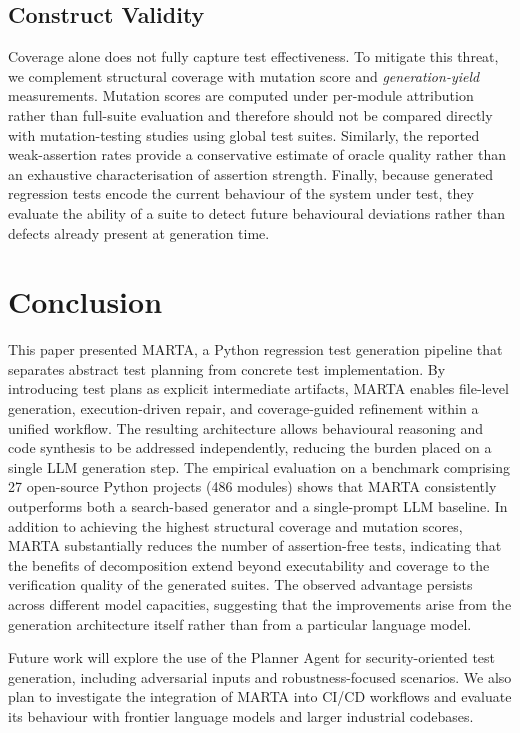 \documentclass{llncs}
\begin{document}
\subsection{Construct Validity}

Coverage alone does not fully capture test effectiveness. To mitigate this threat, we complement structural coverage with mutation score and \emph{generation-yield} measurements. Mutation scores are computed under per-module attribution rather than full-suite evaluation and therefore should not be compared directly with mutation-testing studies using global test suites. Similarly, the reported weak-assertion rates provide a conservative estimate of oracle quality rather than an exhaustive characterisation of assertion strength. Finally, because generated regression tests encode the current behaviour of the system under test, they evaluate the ability of a suite to detect future behavioural deviations rather than defects already present at generation time.



\section{Conclusion}
\label{sec:conc}

This paper presented MARTA, a Python regression test generation pipeline that separates abstract test planning from concrete test implementation. By introducing test plans as explicit intermediate artifacts, MARTA enables file-level generation, execution-driven repair, and coverage-guided refinement within a unified workflow. The resulting architecture allows behavioural reasoning and code synthesis to be addressed independently, reducing the burden placed on a single LLM generation step.
%
The empirical evaluation on a benchmark comprising 27 open-source Python projects (486 modules) shows that MARTA consistently outperforms both a search-based generator and a single-prompt LLM baseline. In addition to achieving the highest structural coverage and mutation scores, MARTA substantially reduces the number of assertion-free tests, indicating that the benefits of decomposition extend beyond executability and coverage to the verification quality of the generated suites. The observed advantage persists across different model capacities, suggesting that the improvements arise from the generation architecture itself rather than from a particular language model.

Future work will explore the use of the Planner Agent for security-oriented test generation, including adversarial inputs and robustness-focused scenarios. We also plan to investigate the integration of MARTA into CI/CD workflows and evaluate its behaviour with frontier language models and larger industrial codebases.
\end{document}
